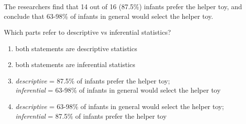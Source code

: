 \begin{frame}
\frametitle{\grp}
The researchers find that 14 out of 16 (87.5\%) infants prefer the helper toy, and conclude that 63-98\% of infants in general would select the helper toy.
\begin{clicker}{Which parts refer to descriptive vs inferential statistics?}
\begin{enumerate}
    \item
    both statements are descriptive statistics
    \item
    both statements are inferential statistics
    \item
    \emph{descriptive} = 87.5\% of infants prefer the helper toy;\\ \emph{inferential} = 63-98\% of infants in general would select the helper toy
    \item
    \emph{descriptive} = 63-98\% of infants in general would select the helper toy;\\ \emph{inferential} = 87.5\% of infants prefer the helper toy
\end{enumerate}
\end{clicker}
\end{frame}




